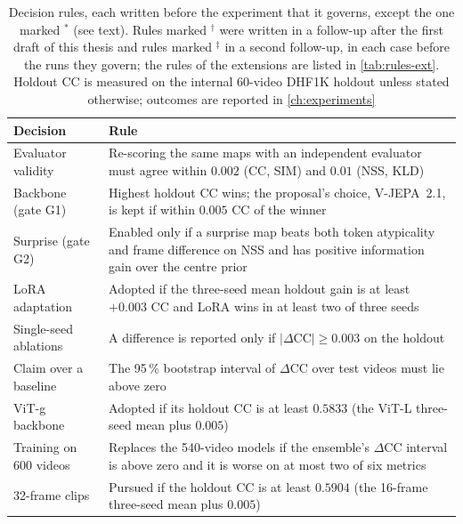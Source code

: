 \begin{table}[htbp]
  \centering
  \caption{Decision rules, each written before the experiment that it
  governs, except the one marked $^{\ast}$ (see text). Rules marked $^{\dagger}$
  were written in a follow-up after the first draft of this thesis and rules
  marked $^{\ddagger}$ in a second follow-up, in each case before the runs they
  govern; the rules of the extensions are listed in \cref{tab:rules-ext}.
  Holdout \acrshort{CC} is measured on the internal 60-video DHF1K
  holdout unless stated otherwise; outcomes are reported in
  \cref{ch:experiments}}\label{tab:rules}
  \small
  \begin{tabularx}{\textwidth}{@{}>{\raggedright}p{3.3cm}>{\raggedright\arraybackslash}X@{}}
    \toprule
    \textbf{Decision} & \textbf{Rule} \\
    \midrule
    Evaluator validity & Re-scoring the same maps with an independent
      evaluator must agree within $0.002$ (\acrshort{CC}, \acrshort{SIM}) and $0.01$ (\acrshort{NSS}, \acrshort{KLD}) \\
    Backbone (gate G1) & Highest holdout \acrshort{CC} wins; the proposal's choice,
      \acrshort{V-JEPA}~2.1, is kept if within $0.005$ \acrshort{CC} of the winner \\
    Surprise (gate G2) & Enabled only if a surprise map beats both token
      atypicality and frame difference on \acrshort{NSS} and has positive information
      gain over the centre prior \\
    \acrshort{LoRA} adaptation & Adopted if the three-seed mean holdout gain is at least
      $+0.003$ \acrshort{CC} and \acrshort{LoRA} wins in at least two of three seeds \\
    Single-seed ablations & A difference is reported only if
      $|\Delta\mathrm{CC}|\geq0.003$ on the holdout \\
    Claim over a baseline & The 95\,\% bootstrap interval of $\Delta$\acrshort{CC} over
      test videos must lie above zero \\
    \acrshort{ViT}-g backbone & Adopted if its holdout \acrshort{CC} is at least $0.5833$ (the
      \acrshort{ViT}-L three-seed mean plus $0.005$) \\
    Training on 600 videos & Replaces the 540-video models if the ensemble's
      $\Delta$\acrshort{CC} interval is above zero and it is worse on at most two of six
      metrics \\
    32-frame clips & Pursued if the holdout \acrshort{CC} is at least $0.5904$ (the
      16-frame three-seed mean plus $0.005$) \\

\end{tabularx}
\end{table}
